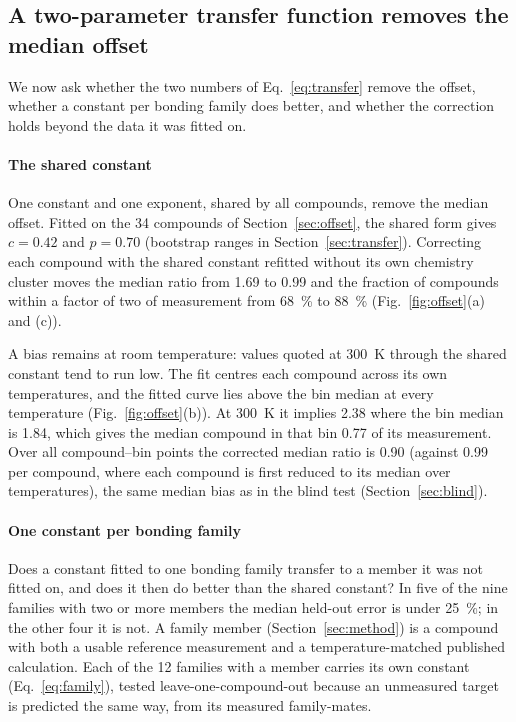 \subsection{A two-parameter transfer function removes the median offset}
\label{sec:transferresults}

We now ask whether the two numbers of Eq.~\eqref{eq:transfer} remove the offset, whether a constant
per bonding family does better, and whether the correction holds beyond the data it was fitted on.

\paragraph{The shared constant} One constant and one exponent, shared by all compounds, remove the
median offset. Fitted on the \num{34} compounds of Section~\ref{sec:offset}, the shared form gives
$c=\num{0.42}$ and $p=\num{0.70}$ (bootstrap ranges in Section~\ref{sec:transfer}). Correcting each
compound with the shared constant refitted without its own chemistry cluster moves the median ratio
from \num{1.69} to \num{0.99} and the fraction of compounds within a factor of two of measurement
from \SI{68}{\percent} to \SI{88}{\percent} (Fig.~\ref{fig:offset}(a) and (c)).

A bias remains at room temperature: values quoted at \SI{300}{\kelvin} through the shared constant
tend to run low. The fit centres each compound across its own temperatures, and the fitted curve lies
above the bin median at every temperature (Fig.~\ref{fig:offset}(b)). At \SI{300}{\kelvin} it
implies \num{2.38} where the bin median is \num{1.84}, which gives the median compound in that bin
\num{0.77} of its measurement. Over all compound--bin
points the corrected median ratio is \num{0.90} (against \num{0.99} per compound, where each compound
is first reduced to its median over temperatures), the same median bias as in the blind test
(Section~\ref{sec:blind}).

\paragraph{One constant per bonding family}
\label{sec:familycal}
\label{sec:deployed}
Does a constant fitted to one bonding family transfer to a member it was not fitted on, and does it
then do better than the shared constant? In five of the nine families with two or more members the
median held-out error is under \SI{25}{\percent}; in the other four it is not. A family member (Section~\ref{sec:method}) is a
compound with both a usable reference measurement and a temperature-matched published calculation.
Each of the \num{12} families with a member carries its own constant
(Eq.~\eqref{eq:family}), tested leave-one-compound-out because an unmeasured target is predicted
the same way, from its measured family-mates.

